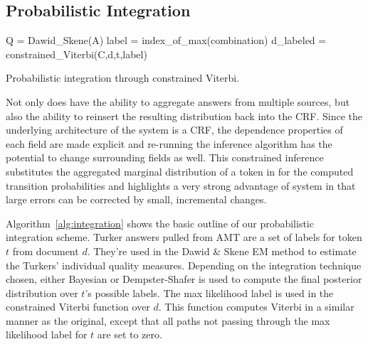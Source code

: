 \subsection{Probabilistic Integration}
\label{sec:probInt}

\begin{algorithm}[fillcomment]
\label{alg:integration}
\BlankLine
{}\;
Q = Dawid\_Skene(A)\;
\;
\;
label = index\_of\_max(combination)\;
d\_labeled = constrained\_Viterbi(C,d,t,label)\;

\caption{Probabilistic integration through constrained Viterbi.}
\end{algorithm}

Not only does \sysName have the ability to aggregate answers from multiple sources, but also the ability to reinsert the resulting distribution back into the CRF. Since the underlying architecture of the system is a CRF, the dependence properties of each field are made explicit and re-running the inference algorithm has the potential to change surrounding fields as well.  This constrained inference substitutes the aggregated marginal distribution of a token in for the computed transition probabilities and highlights a very strong advantage of \sysName system in that large errors can be corrected by small, incremental changes.

Algorithm~\ref{alg:integration} shows the basic outline of our probabilistic integration scheme.  Turker answers pulled from AMT are a set of labels for token $t$ from document $d$.  They're used in the Dawid \& Skene EM method to estimate the Turkers' individual quality measures.  Depending on the integration technique chosen, either Bayesian or Dempster-Shafer is used to compute the final posterior distribution over $t$'s possible labels.  The max likelihood label is used in the constrained Viterbi function over $d$.  This function computes Viterbi in a similar manner as the original, except that all paths not passing through the max likelihood label for $t$ are set to zero.

